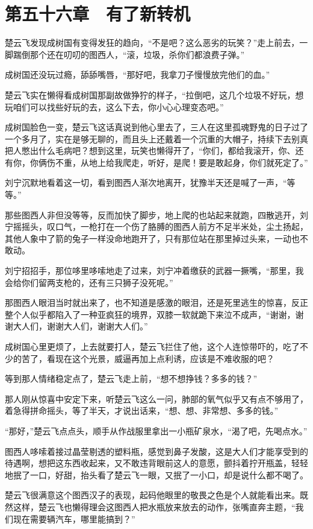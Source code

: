 \section{第五十六章　有了新转机}

楚云飞发现成树国有变得发狂的趋向，“不是吧？这么恶劣的玩笑？”走上前去，一脚踹倒那个还在叨叨的图西人，“滚，垃圾，杀你们都浪费子弹。”

成树国还没玩过瘾，舔舔嘴唇，“那好吧，我拿刀子慢慢放完他们的血。”

楚云飞实在懒得看成树国那副故做狰狞的样子，“拉倒吧，这几个垃圾不好玩，想玩咱们可以找些好玩的去，这么下去，你小心心理变态吧。”

成树国脸色一变，楚云飞这话真说到他心里去了，三人在这里孤魂野鬼的日子过了一个多月了，实在是够无聊的，而且头上还戴着一个沉重的大帽子，持续下去别真把人憋出什么毛病吧？想到这里，玩笑也懒得开了，“你们，都给我滚开，你、还有你，你俩伤不重，从地上给我爬走，听好，是爬！要是敢起身，你们就死定了。”

刘宁沉默地看着这一切，看到图西人渐次地离开，犹豫半天还是喊了一声，“等等。”

那些图西人非但没等等，反而加快了脚步，地上爬的也站起来就跑，四散逃开，刘宁摇摇头，叹口气，一枪打在一个伤了胳膊的图西人前方不足半米处，尘土扬起，其他人象中了箭的兔子一样没命地跑开了，只有那位站在那里掉过头来，一动也不敢动。

刘宁招招手，那位哆里哆嗦地走了过来，刘宁冲着缴获的武器一撅嘴，“那里，我会给你们留两支枪的，还有三只狮子没死呢。”

那图西人眼泪当时就出来了，也不知道是感激的眼泪，还是死里逃生的惊喜，反正整个人似乎都陷入了一种亚疯狂的境界，双膝一软就跪下来泣不成声，“谢谢，谢谢大人们，谢谢大人们，谢谢大人们。”

成树国心里更烦了，上去就要打人，楚云飞拦住了他，这个人连惊带吓的，吃了不少的苦了，看现在这个光景，威逼再加上点利诱，应该是不难收服的吧？

等到那人情绪稳定点了，楚云飞走上前，“想不想挣钱？多多的钱？”

那人刚从惊喜中安定下来，听楚云飞这么一问，肺部的氧气似乎又有点不够用了，着急得拼命摇头，等了半天，才说出话来，“想、想、非常想、多多的钱。”

“那好，”楚云飞点点头，顺手从作战服里拿出一小瓶矿泉水，“渴了吧，先喝点水。”

图西人哆嗦着接过晶莹剔透的塑料瓶，感觉到鼻子发酸，这是大人们才能享受到的待遇啊，想把这东西收起来，又不敢违背眼前这人的意愿，颤抖着拧开瓶盖，轻轻地抿了一口，好甜，抬头看了楚云飞一眼，又抿了一小口，却是说什么都不喝了。

楚云飞很满意这个图西汉子的表现，起码他眼里的敬畏之色是个人就能看出来。既然这样，楚云飞也懒得理会这图西人把水瓶放来放去的动作，张嘴直奔主题，“我们现在需要辆汽车，哪里能搞到？”

